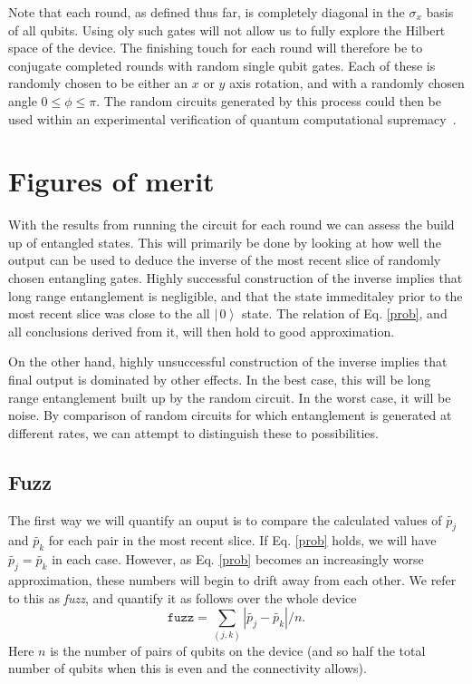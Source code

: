 \documentclass[aps,prl,twocolumn,showpacs,preprintnumbers]{revtex4-1}
\newcommand{\be}{\begin{equation}}
\newcommand{\ee}{\end{equation}}
\newcommand{\ket}[1]{\left | \, #1 \right\rangle}
\begin{document}
Note that each round, as defined thus far, is completely diagonal in the $\sigma_x$ basis of all qubits. Using oly such gates will not allow us to fully explore the Hilbert space of the device. The finishing touch for each round will therefore be to conjugate completed rounds with random single qubit gates. Each of these is randomly chosen to be either an $x$ or $y$ axis rotation, and with a randomly chosen angle $0\leq\phi\leq\pi$. The random circuits generated by this process could then be used within an experimental verification of quantum computational supremacy~\cite{boixo}.


\section{Figures of merit}

With the results from running the circuit for each round we can assess the build up of entangled states. This will primarily be done by looking at how well the output can be used to deduce the inverse of the most recent slice of randomly chosen entangling gates. Highly successful construction of the inverse implies that long range entanglement is negligible, and that the state immeditaley prior to the most recent slice was close to the all $\ket{0}$ state. The relation of Eq. \ref{prob}, and all conclusions derived from it, will then hold to good approximation.

On the other hand, highly unsuccessful construction of the inverse implies that final output is dominated by other effects. In the best case, this will be long range entanglement built up by the random circuit. In the worst case, it will be noise. By comparison of random circuits for which entanglement is generated at different rates, we can attempt to distinguish these to possibilities.

\subsection{Fuzz}

The first way we will quantify an ouput is to compare the calculated values of $\tilde{p_j}$ and $\tilde{p_k}$ for each pair in the most recent slice. If Eq. \ref{prob} holds, we will have $\tilde{p_j}=\tilde{p_k}$ in each case. However, as Eq. \ref{prob} becomes an increasingly worse approximation, these numbers will begin to drift away from each other. We refer to this as \textit{fuzz}, and quantify it as follows over the whole device
\be
\mathtt{fuzz} = \sum_{(j,k)} | \tilde{p_j} - \tilde{p_k} | / n.
\ee
Here $n$ is the number of pairs of qubits on the device (and so half the total number of qubits when this is even and the connectivity allows).
\end{document}
